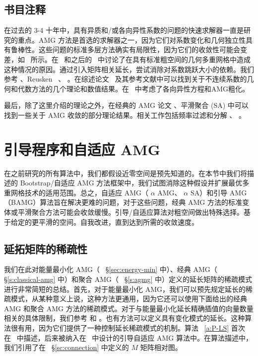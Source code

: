 \documentclass[12pt]{acta_2011xz}
\begin{document}
   \subsection{书目注释  }    在过去的 3-4 十年中，具有异质和/或各向异性系数的问题的快速求解器一直是研究的重点。AMG 方法是首选的求解器之一，因为它们对系数变化和几何独立性具有鲁棒性。这些问题的标准多层方法确实有局限性，因为它们的收敛性可能会变差，如~    \cite{1981AlcouffeR_BrandtA_DendyJ_PainterJ-aa}    所示。在~    \cite{1991BrambleJ_XuJ-aa,1991XuJ-aa}    和之后的~    \cite{1999OswaldP-aa}    中讨论了在具有标准粗空间的几何多重网格中造成这种情况的原因。通过引入矩阵相关延长，尝试消除对系数跳跃大小的依赖。我们参考
   \cite{1982DendyJ-ab,1983DendyJ-aa}   、Reusken~    \cite{1993ReuskenA-aa}   、
   \cite{1990ZeeuwP-aa}   。在综述论文~    \cite{2000ChanT_WanW-aa}    及其参考文献中可以找到关于不连续系数的几何和代数方法的几个理论和数值结果。在~   \cite{Brannick.J;Brezina.M;MacLachlan.S;Manteuffel.T;McCormick.S;Ruge.J.2006a}   中考虑了各向异性方程和AMG粗化。  

最后，除了这里介绍的理论之外，在经典的 AMG 论文    \cite{Ruge.J;Stuben.K.1987a}   、平滑聚合 (SA)    \cite{1996VanekP_MandelJ_BrezinaM-aa}    中可以找到一些关于 AMG 收敛的部分理论结果。相关工作包括频率过滤和分解
   \cite{1989HackbuschW-aa}   、
   \cite{1992WittumG-aa,1997WagnerC_WittumG-aa,1997WeilerW_WittumG-aa,2008NagelA_FalgoutR_WittumG-aa}    。  

   \section{引导程序和自适应 AMG  }       \label{s:adaptiveAMG}    在之前研究的所有算法中，我们都假设近零空间是预先知道的。在本节中我们将描述的 Bootstrap/自适应 AMG 方法框架中，我们试图消除这种假设并扩展最优多重网格技术的适用范围。总之，自适应 AMG（   $\alpha$    AMG、   $\alpha$    SA）和引导 AMG（BAMG）算法旨在解决更难的问题，对于这些问题，经典 AMG 方法的标准变体或平滑聚合方法可能会收敛缓慢。引导/自适应算法对粗空间做出特殊选择。基于给定的更平滑的空间。自我改进，直到达到所需的收敛速度。  

   \subsection{延拓矩阵的稀疏性  }       \label{s:sparse-summary}     

我们在此对能量最小化 AMG（~    \S       \ref{sec:energy-min}    中）、经典 AMG（~    \S       \ref{s:classical-amg}    中）和聚合 AMG（~    \S       \ref{s:agmg}    中）定义的延长矩阵的稀疏模式进行非常简短的总结。首先，对于能量最小化 AMG，我们可以预先规定延长的稀疏模式，从某种意义上说，这种方法更通用，因为它还可以使用下面给出的经典 AMG 和聚合 AMG 方法的稀疏模式。对于与能量最小化延长精确插值的向量数量相关的具体限制，我们参考
   \cite{Xu.J;Zikatanov.L.2004a}    和
   \cite{2006VassilevskiP_ZikatanovL-aa}    。也有方法可以定义具有变化模式的延长。这种算法很有用，因为它们提供了一种控制延长稀疏模式的机制。算法~    \ref{a:P-LS}    首次在~    \cite{original_BS}    中描述，后来被纳入在~    \cite{BS_2011}    中设计的引导自适应 AMG 算法中。在算法描述中，我们引用了在~    \S       \ref{sc:connection}    中定义的    $M$    矩阵相对图。  
\end{document}
